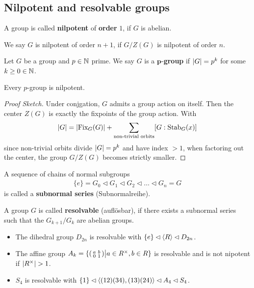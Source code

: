 \subsection{Nilpotent and resolvable groups}

\begin{dfn}[]
A group is called \textbf{nilpotent} of \textbf{order} $1$, if $G$ is abelian.

We say $G$ is nilpotent of order $n+1$, if $G/Z(G)$ is nilpotent of order $n$.
\end{dfn}


\begin{dfn}[]
Let $G$ be a group and $p \in \mathbb{N}$ prime. We say $G$ is a $\bm{p}$-\textbf{group} if $\vert G\vert = p^{k}$ for some $k \geq 0 \in \mathbb{N}$.
\end{dfn}

\begin{prop}[]
Every $p$-group is nilpotent.
\end{prop}
\begin{proof}[Proof Sketch]
  Under conjgation, $G$ admits a group action on itself. Then the center $Z(G)$ is exactly the fixpoints of the group action. 
  With
  \begin{align*}
    \vert G\vert = \vert\text{Fix}_G(G)\vert + \sum_{\text{non-trivial orbits}} [G: \text{Stab}_G(x)]
  \end{align*}
  since non-trivial orbits divide $\vert G\vert = p^{k}$ and have index $> 1$, when factoring out the center, the group $G/Z(G)$ becomes strictly smaller.
\end{proof}

\begin{dfn}[]
A sequence of chains of normal subgroups
\begin{align*}
  \{e\} = G_0 \lhd G_1 \lhd G_2 \lhd  \ldots \lhd  G_n = G
\end{align*}
is called a \textbf{subnormal series} (Subnormalreihe).

A group $G$ is called \textbf{resolvable} (auflösbar), if there exists a subnormal series such that the $G_{k+1}/G_k$ are abelian groups.
\end{dfn}

\begin{itemize}
  \item The dihedral group $D_{2n}$ is resolvable with $\{e\} \lhd \langle R\rangle \lhd D_{2n}$.
  \item The affine group $A_k = \{\begin{psmallmatrix}
   a &b \\
   0& 1
  \end{psmallmatrix} \big\vert a \in R^{\times}, b \in R
  \}
  $ is resolvable and is not nipotent if $\vert R^{\times}\vert > 1$.
\item $S_4$ is resolvable with $\{1\} \lhd  \langle(12)(34),(13)(24)\rangle \lhd A_4 \lhd  S_4$.
\end{itemize}

